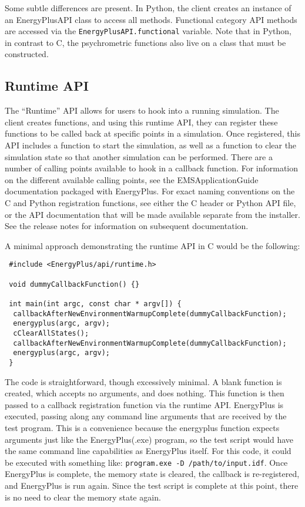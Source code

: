 Some subtle differences are present.
In Python, the client creates an instance of an EnergyPlusAPI class to access all methods.
Functional category API methods are accessed via the \verb=EnergyPlusAPI.functional= variable.
Note that in Python, in contrast to C, the psychrometric functions also live on a class that must be constructed.

\subsection{Runtime API}\label{subsec:runtime-api}

The ``Runtime'' API allows for users to hook into a running simulation.
The client creates functions, and using this runtime API, they can register these functions to be called back at specific points in a simulation.
Once registered, this API includes a function to start the simulation, as well as a function to clear the simulation state so that another simulation can be performed.
There are a number of calling points available to hook in a callback function.
For information on the different available calling points, see the EMSApplicationGuide documentation packaged with EnergyPlus.
For exact naming conventions on the C and Python registration functions, see either the C header or Python API file, or the API documentation that will be made available separate from the installer.
See the release notes for information on subsequent documentation.

A minimal approach demonstrating the runtime API in C would be the following:

\begin{lstlisting}
 #include <EnergyPlus/api/runtime.h>

 void dummyCallbackFunction() {}

 int main(int argc, const char * argv[]) {
  callbackAfterNewEnvironmentWarmupComplete(dummyCallbackFunction);
  energyplus(argc, argv);
  cClearAllStates();
  callbackAfterNewEnvironmentWarmupComplete(dummyCallbackFunction);
  energyplus(argc, argv);
 }
\end{lstlisting}

The code is straightforward, though excessively minimal.
A blank function is created, which accepts no arguments, and does nothing.
This function is then passed to a callback registration function via the runtime API.
EnergyPlus is executed, passing along any command line arguments that are received by the test program.
This is a convenience because the energyplus function expects arguments just like the EnergyPlus(.exe) program, so the test script would have the same command line capabilities as EnergyPlus itself.
For this code, it could be executed with something like: \verb=program.exe -D /path/to/input.idf=.
Once EnergyPlus is complete, the memory state is cleared, the callback is re-registered, and EnergyPlus is run again.
Since the test script is complete at this point, there is no need to clear the memory state again.

